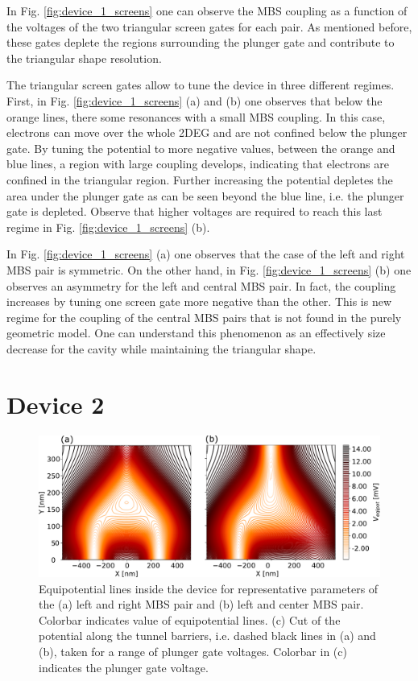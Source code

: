 In Fig. \ref{fig:device_1_screens} one can observe the MBS coupling as a function of the voltages of the two triangular screen gates for each pair.
As mentioned before, these gates deplete the regions surrounding the plunger gate and contribute to the triangular shape resolution.

The triangular screen gates allow to tune the device in three different regimes.
First, in Fig. \ref{fig:device_1_screens} (a) and (b) one observes that below the orange lines, there some resonances with a small MBS coupling.
In this case, electrons can move over the whole 2DEG and are not confined below the plunger gate.
By tuning the potential to more negative values, between the orange and blue lines, a region with large coupling develops, indicating that electrons are confined in the triangular region.
Further increasing the potential depletes the area under the plunger gate as can be seen beyond the blue line, i.e. the plunger gate is depleted.
Observe that higher voltages are required to reach this last regime in Fig. \ref{fig:device_1_screens} (b).

In Fig. \ref{fig:device_1_screens} (a) one observes that the case of the left and right MBS pair is symmetric.
On the other hand, in Fig. \ref{fig:device_1_screens} (b) one observes an asymmetry for the left and central MBS pair.
In fact, the coupling increases by tuning one screen gate more negative than the other.
This is new regime for the coupling of the central MBS pairs that is not found in the purely geometric model.
One can understand this phenomenon as an effectively size decrease for the cavity while maintaining the triangular shape.

\section{Device 2}

\begin{figure}[h!]
\centering
  \includegraphics[width=0.75\linewidth]{figures/device_2_potential.pdf}
  \caption{Equipotential lines inside the device for representative parameters of the (a) left and right MBS pair and (b) left and center MBS pair. Colorbar indicates value of equipotential lines. (c) Cut of the potential along the tunnel barriers, i.e. dashed black lines in (a) and (b), taken for a range of plunger gate voltages. Colorbar in (c) indicates the plunger gate voltage.}
  \label{fig:device_2_potential}
\end{figure}

